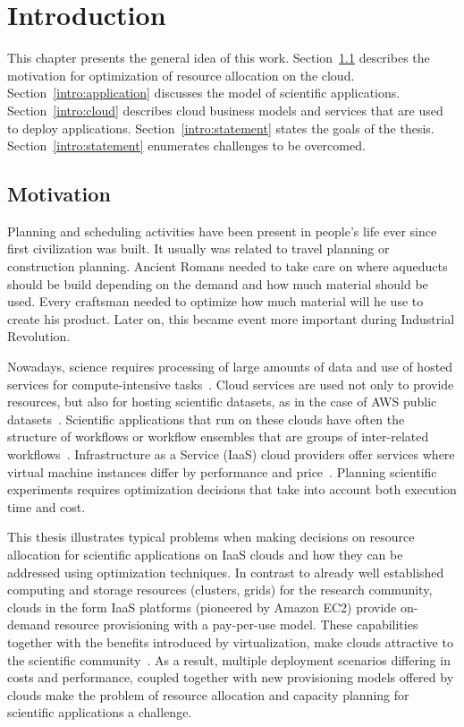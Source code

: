 \chapter{Introduction}
\label{chap:introduction} 

This chapter presents the general idea of this work. Section~\ref{intro:motivation} describes the motivation for optimization of resource allocation on the cloud. Section~\ref{intro:application} discusses the model of scientific applications. Section~\ref{intro:cloud} describes cloud business models and services that are used to deploy applications. Section~\ref{intro:statement} states the goals of the thesis. Section~\ref{intro:statement} enumerates challenges to be overcomed. 

\section{Motivation}
\label{intro:motivation}

Planning and scheduling activities have been present in people's life ever since first civilization was built. It usually was related to travel planning or construction planning. Ancient Romans needed to take care on where aqueducts should be build depending on the demand and how much material should be used. Every craftsman needed to optimize how much material will he use to create his product. Later on, this became event more important during Industrial Revolution.

Nowadays, science requires processing of large amounts of data and use of hosted services for compute-intensive tasks~\cite{Deelman-PPL13}. Cloud services are used not only to provide resources, but also for hosting scientific datasets, as in the case of AWS public datasets~\cite{AWS-public-dataset}. Scientific applications that run on these clouds have often the structure of workflows or workflow ensembles that are groups of inter-related workflows~\cite{Malawski-SC12}. Infrastructure as a Service (IaaS) cloud providers offer services where virtual machine instances differ by performance and price~\cite{Bubak-CCGrid13}. Planning scientific experiments requires optimization decisions that take into account both execution time and cost.

This thesis illustrates typical problems when making decisions on resource allocation for scientific applications on IaaS clouds and how they can be addressed using optimization techniques. In contrast to already well established computing and storage resources (clusters, grids) for the research community, clouds in the form IaaS  platforms (pioneered by Amazon EC2) provide on-demand resource provisioning with a pay-per-use model. These capabilities together with the benefits introduced by virtualization, make clouds attractive to the scientific community~\cite{Deelman09}. As a result, multiple deployment scenarios differing in costs and performance, coupled together with new provisioning models offered by clouds make the problem of resource allocation and capacity planning for scientific applications a challenge.

